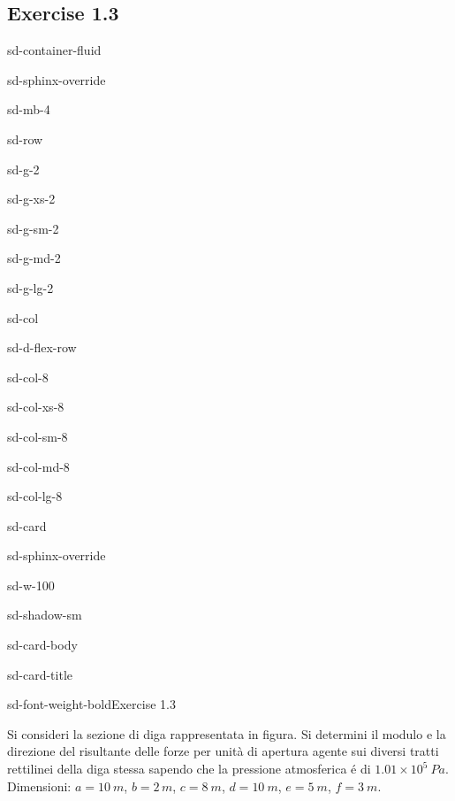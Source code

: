 \documentclass[letterpaper,10pt,italian]{jupyterBook}
\begin{document}
\subsection{Exercise 1.3}
\label{\detokenize{polimi/fluidmechanics-ita/template/capitoli/01_statica/0203in:exercise-1-3}}\label{\detokenize{polimi/fluidmechanics-ita/template/capitoli/01_statica/0203in:fluid-mechanics-statics-ex-03}}\label{\detokenize{polimi/fluidmechanics-ita/template/capitoli/01_statica/0203in::doc}}
\begin{sphinxuseclass}{sd-container-fluid}
\begin{sphinxuseclass}{sd-sphinx-override}
\begin{sphinxuseclass}{sd-mb-4}
\begin{sphinxuseclass}{sd-row}
\begin{sphinxuseclass}{sd-g-2}
\begin{sphinxuseclass}{sd-g-xs-2}
\begin{sphinxuseclass}{sd-g-sm-2}
\begin{sphinxuseclass}{sd-g-md-2}
\begin{sphinxuseclass}{sd-g-lg-2}
\begin{sphinxuseclass}{sd-col}
\begin{sphinxuseclass}{sd-d-flex-row}
\begin{sphinxuseclass}{sd-col-8}
\begin{sphinxuseclass}{sd-col-xs-8}
\begin{sphinxuseclass}{sd-col-sm-8}
\begin{sphinxuseclass}{sd-col-md-8}
\begin{sphinxuseclass}{sd-col-lg-8}
\begin{sphinxuseclass}{sd-card}
\begin{sphinxuseclass}{sd-sphinx-override}
\begin{sphinxuseclass}{sd-w-100}
\begin{sphinxuseclass}{sd-shadow-sm}
\begin{sphinxuseclass}{sd-card-body}
\begin{sphinxuseclass}{sd-card-title}
\begin{sphinxuseclass}{sd-font-weight-bold}Exercise 1.3
\end{sphinxuseclass}
\end{sphinxuseclass}
\sphinxAtStartPar
Si consideri la sezione di diga rappresentata in figura.
Si determini il modulo e la direzione del risultante
delle forze per unità di apertura agente sui diversi
tratti rettilinei della diga stessa sapendo che la pressione
atmosferica é di \(1.01 \times 10^5\ Pa\). Dimensioni: \(a=10\ m\),
\(b=2\, m\), \(c=8\ m\), \(d=10\ m\), \(e=5\ m\), \(f=3\ m\).


\end{sphinxuseclass}
\end{sphinxuseclass}
\end{sphinxuseclass}
\end{sphinxuseclass}
\end{sphinxuseclass}
\end{sphinxuseclass}
\end{sphinxuseclass}
\end{sphinxuseclass}
\end{sphinxuseclass}
\end{sphinxuseclass}
\end{sphinxuseclass}
\end{sphinxuseclass}
\end{sphinxuseclass}
\end{sphinxuseclass}
\end{sphinxuseclass}
\end{sphinxuseclass}
\end{sphinxuseclass}
\end{sphinxuseclass}
\end{sphinxuseclass}
\end{sphinxuseclass}
\end{sphinxuseclass}
\end{document}
